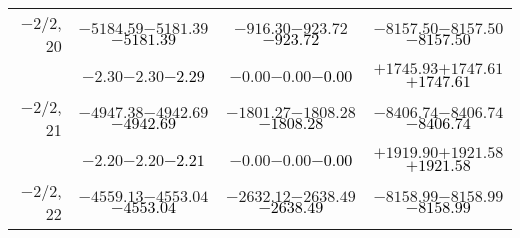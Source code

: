 \documentclass[compress]{beamer}
\begin{document}
\begin{frame}
{\begin{tabular}{r | c | c | c}
$-$2/2, 20 & $-5184.59$\hspace{0.1 cm}$-5181.39$\hspace{0.1 cm}\textcolor{black}{$-5181.39$} & $-916.30$\hspace{0.1 cm}$-923.72$\hspace{0.1 cm}\textcolor{black}{$-923.72$} & $-8157.50$\hspace{0.1 cm}$-8157.50$\hspace{0.1 cm}\textcolor{black}{$-8157.50$} \\
           & $-2.30$\hspace{0.1 cm}$-2.30$\hspace{0.1 cm}\textcolor{black}{$-2.29$} & $-0.00$\hspace{0.1 cm}$-0.00$\hspace{0.1 cm}\textcolor{black}{$-0.00$} & $+1745.93$\hspace{0.1 cm}$+1747.61$\hspace{0.1 cm}\textcolor{black}{$+1747.61$} \\
$-$2/2, 21 & $-4947.38$\hspace{0.1 cm}$-4942.69$\hspace{0.1 cm}\textcolor{black}{$-4942.69$} & $-1801.27$\hspace{0.1 cm}$-1808.28$\hspace{0.1 cm}\textcolor{black}{$-1808.28$} & $-8406.74$\hspace{0.1 cm}$-8406.74$\hspace{0.1 cm}\textcolor{black}{$-8406.74$} \\
           & $-2.20$\hspace{0.1 cm}$-2.20$\hspace{0.1 cm}\textcolor{black}{$-2.21$} & $-0.00$\hspace{0.1 cm}$-0.00$\hspace{0.1 cm}\textcolor{black}{$-0.00$} & $+1919.90$\hspace{0.1 cm}$+1921.58$\hspace{0.1 cm}\textcolor{black}{$+1921.58$} \\
$-$2/2, 22 & $-4559.13$\hspace{0.1 cm}$-4553.04$\hspace{0.1 cm}\textcolor{black}{$-4553.04$} & $-2632.12$\hspace{0.1 cm}$-2638.49$\hspace{0.1 cm}\textcolor{black}{$-2638.49$} & $-8158.99$\hspace{0.1 cm}$-8158.99$\hspace{0.1 cm}\textcolor{black}{$-8158.99$} \\

\end{tabular}}
\end{frame}
\end{document}
